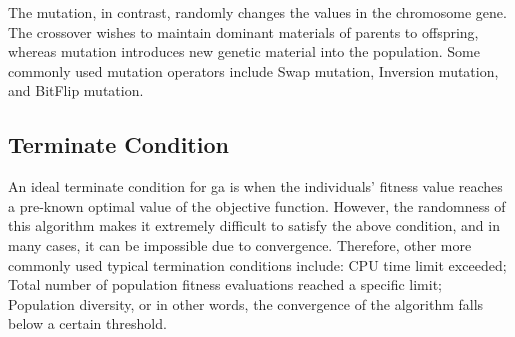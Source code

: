 The mutation, in contrast, randomly changes  the values in the chromosome gene. The crossover wishes to maintain dominant materials of parents to offspring, whereas mutation introduces new genetic material into the population. Some commonly used mutation operators include Swap mutation, Inversion mutation, and BitFlip mutation.

\subsection {Terminate Condition}
\label{ga:terminate}
An ideal terminate condition for \gls{ga} is when the individuals' fitness value reaches a pre-known optimal value of the objective function. However, the randomness of this algorithm makes it extremely difficult to satisfy the above condition, and in many cases, it can be impossible due to convergence. Therefore, other more commonly used typical termination conditions include: CPU time limit exceeded; Total number of population fitness evaluations reached a specific limit; Population diversity, or in other words, the convergence of the algorithm falls below a certain threshold.